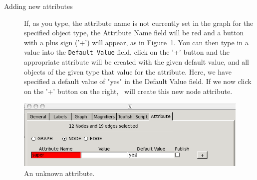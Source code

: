 \begin{description}
\item[Adding new attributes]
If, as you type, the attribute name is not currently set in the graph for the specified object type,
the Attribute Name field will be red and
a button with a plus sign ('+') will appear, as in Figure~\ref{fig:attr4}.
You can then type in a value into the {\tt Default Value} field, click on the '+' button and
the appropriate attribute will be created with the given default value, and all objects
of the given type that value for the attribute.
Here, we have specified a default
value of "yes" in the Default Value field. If we now click on the '+' button on the right,
\smyrna\ will create this new node attribute.

\end{description}

\begin{figure}[ht]
\begin{center}
\includegraphics[scale=.5]{figures/attr4.png}
\caption{\small An unknown attribute.}
\label{fig:attr4}
\end{center}
\end{figure}

